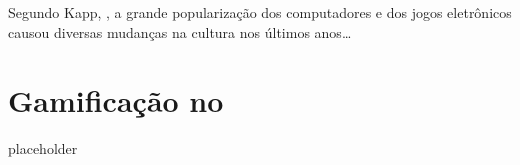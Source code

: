 Segundo Kapp, \cite{kapp_gamification}, a grande popularização dos computadores e dos jogos eletrônicos causou diversas mudanças na cultura nos últimos anos\dots

\section{Gamificação no \appName}

placeholder
